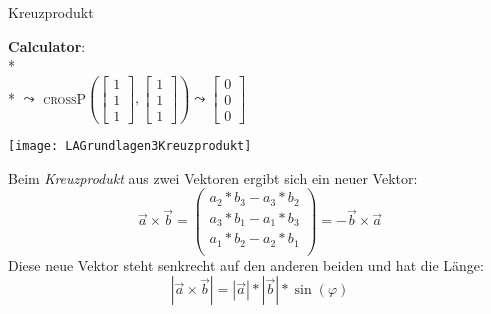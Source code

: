 \begin{bla}{Kreuzprodukt}
   \begin{marginfigure}[5em]
    \begin{tcolorbox}[colback=white!95!black,colframe=white!75!black,title=CAS:,arc=0mm]
      \begin{scriptsize}
        \textbf{Calculator}: \\*
         \\*
        \( \leadsto \) \textsc{crossP}\( \left( \left[ \begin{smallmatrix}
          1 \\ 1 \\ 1
        \end{smallmatrix} \right], \left[ \begin{smallmatrix}
          1 \\ 1 \\ 1
        \end{smallmatrix} \right] \right) \leadsto \left[ \begin{smallmatrix}
          0 \\ 0 \\ 0
        \end{smallmatrix} \right] \)
      \end{scriptsize}
    \end{tcolorbox}
  \end{marginfigure}
  \begin{marginfigure}[0em]
    \texttt{[image: LAGrundlagen3Kreuzprodukt]}
    \caption{Kreuzprodukt}
  \end{marginfigure}
Beim \emph{Kreuzprodukt} aus zwei Vektoren ergibt sich ein neuer Vektor:
  \begin{equation*}
      \vec{a} \times \vec{b} =
      \begin{pmatrix}
      a_2 * b_3 - a_3 * b_2 \\
      a_3 * b_1 - a_1 * b_3 \\
      a_1 * b_2 - a_2 * b_1 \\
    \end{pmatrix}
    = - \vec{b} \times \vec{a}
  \end{equation*}
  Diese neue Vektor steht senkrecht auf den anderen beiden und hat die Länge:
  \begin{equation*}
    |\vec{a} \times \vec{b}| = |\vec{a}| * |\vec{b}| * \sin(\varphi)
  \end{equation*}
\end{bla}

